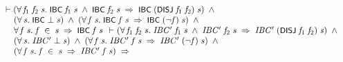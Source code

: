 \documentclass[letterpaper]{article}
\renewcommand{\HOLConst}[1]{{\textsf{\upshape\small #1}}}
\newenvironment{holmath}{\begin{displaymath}\begin{array}{l}}{\end{array}\end{displaymath}\ignorespacesafterend}
\begin{document}
\begin{holmath}
  \ensuremath{\HOLTokenTurnstile}(\HOLSymConst{\HOLTokenForall{}}\HOLBoundVar{f\sb{\mathrm{1}}}\;\HOLBoundVar{f\sb{\mathrm{2}}}\;\HOLBoundVar{s}.\;\HOLConst{IBC}\;\HOLBoundVar{f\sb{\mathrm{1}}}\;\HOLBoundVar{s}\;\HOLSymConst{\HOLTokenConj{}}\;\HOLConst{IBC}\;\HOLBoundVar{f\sb{\mathrm{2}}}\;\HOLBoundVar{s}\;\HOLSymConst{\HOLTokenImp{}}\;\HOLConst{IBC}\;(\HOLConst{DISJ}\;\HOLBoundVar{f\sb{\mathrm{1}}}\;\HOLBoundVar{f\sb{\mathrm{2}}})\;\HOLBoundVar{s})\;\HOLSymConst{\HOLTokenConj{}}\\
\;\;\;\;\;(\HOLSymConst{\HOLTokenForall{}}\HOLBoundVar{s}.\;\HOLConst{IBC}\;\HOLSymConst{\ensuremath{\bot}}\;\HOLBoundVar{s})\;\HOLSymConst{\HOLTokenConj{}}\;(\HOLSymConst{\HOLTokenForall{}}\HOLBoundVar{f}\;\HOLBoundVar{s}.\;\HOLConst{IBC}\;\HOLBoundVar{f}\;\HOLBoundVar{s}\;\HOLSymConst{\HOLTokenImp{}}\;\HOLConst{IBC}\;(\HOLSymConst{\HOLTokenNeg{}}\HOLBoundVar{f})\;\HOLBoundVar{s})\;\HOLSymConst{\HOLTokenConj{}}\\
\;\;\;\;\;\HOLSymConst{\HOLTokenForall{}}\HOLBoundVar{f}\;\HOLBoundVar{s}.\;\HOLBoundVar{f}\;\HOLSymConst{\HOLTokenIn{}}\;\HOLBoundVar{s}\;\HOLSymConst{\HOLTokenImp{}}\;\HOLConst{IBC}\;\HOLBoundVar{f}\;\HOLBoundVar{s}
  \ensuremath{\HOLTokenTurnstile}(\HOLSymConst{\HOLTokenForall{}}\HOLBoundVar{f\sb{\mathrm{1}}}\;\HOLBoundVar{f\sb{\mathrm{2}}}\;\HOLBoundVar{s}.\;\HOLFreeVar{IBC\sp{\prime}}\;\HOLBoundVar{f\sb{\mathrm{1}}}\;\HOLBoundVar{s}\;\HOLSymConst{\HOLTokenConj{}}\;\HOLFreeVar{IBC\sp{\prime}}\;\HOLBoundVar{f\sb{\mathrm{2}}}\;\HOLBoundVar{s}\;\HOLSymConst{\HOLTokenImp{}}\;\HOLFreeVar{IBC\sp{\prime}}\;(\HOLConst{DISJ}\;\HOLBoundVar{f\sb{\mathrm{1}}}\;\HOLBoundVar{f\sb{\mathrm{2}}})\;\HOLBoundVar{s})\;\HOLSymConst{\HOLTokenConj{}}\\
\;\;\;\;\;(\HOLSymConst{\HOLTokenForall{}}\HOLBoundVar{s}.\;\HOLFreeVar{IBC\sp{\prime}}\;\HOLSymConst{\ensuremath{\bot}}\;\HOLBoundVar{s})\;\HOLSymConst{\HOLTokenConj{}}\;(\HOLSymConst{\HOLTokenForall{}}\HOLBoundVar{f}\;\HOLBoundVar{s}.\;\HOLFreeVar{IBC\sp{\prime}}\;\HOLBoundVar{f}\;\HOLBoundVar{s}\;\HOLSymConst{\HOLTokenImp{}}\;\HOLFreeVar{IBC\sp{\prime}}\;(\HOLSymConst{\HOLTokenNeg{}}\HOLBoundVar{f})\;\HOLBoundVar{s})\;\HOLSymConst{\HOLTokenConj{}}\\
\;\;\;\;\;(\HOLSymConst{\HOLTokenForall{}}\HOLBoundVar{f}\;\HOLBoundVar{s}.\;\HOLBoundVar{f}\;\HOLSymConst{\HOLTokenIn{}}\;\HOLBoundVar{s}\;\HOLSymConst{\HOLTokenImp{}}\;\HOLFreeVar{IBC\sp{\prime}}\;\HOLBoundVar{f}\;\HOLBoundVar{s})\;\HOLSymConst{\HOLTokenImp{}}\\

\end{holmath}
\end{document}
